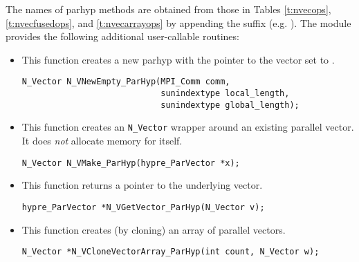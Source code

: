 The names of parhyp methods are obtained from those in Tables \ref{t:nvecops},
\ref{t:nvecfusedops}, and \ref{t:nvecarrayops}
by appending the suffix  (e.g. ).
The module {\nvecph} provides the following additional user-callable routines:
\begin{itemize}


\item {}
 
  This function creates a new parhyp  with the pointer to the {\hypre} 
  vector set to .


\begin{verbatim}
N_Vector N_VNewEmpty_ParHyp(MPI_Comm comm, 
                            sunindextype local_length, 
                            sunindextype global_length);
\end{verbatim}

  

\item {}
  
  This function creates an \verb|N_Vector| wrapper around an existing
  {\hypre} parallel vector. It does {\em not} allocate memory for  
  itself.  

\begin{verbatim}
N_Vector N_VMake_ParHyp(hypre_ParVector *x);
\end{verbatim}


\item {}
  
  This function returns a pointer to the underlying {\hypre} vector.
 
    
  \verb|hypre_ParVector *N_VGetVector_ParHyp(N_Vector v);|



\item {}
 
  This function creates (by cloning) an array of  parallel vectors.
 
\begin{verbatim}
N_Vector *N_VCloneVectorArray_ParHyp(int count, N_Vector w);
\end{verbatim}



\end{itemize}

